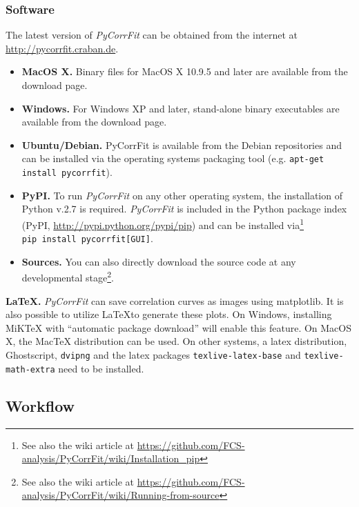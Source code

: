 \subsubsection{Software}
\label{sec:intro.prere.softw}
The latest version of \textit{PyCorrFit} can be obtained from the internet at \url{http://pycorrfit.craban.de}.
\begin{itemize}
\item \textbf{MacOS X.}
Binary files for MacOS X 10.9.5 and later are available from the download page.
\item \textbf{Windows.}
For Windows XP and later, stand-alone binary executables are available from the download page. 
\item \textbf{Ubuntu/Debian.}
PyCorrFit is available from the Debian repositories and can be installed via the operating systems packaging tool (e.g. \texttt{apt-get install pycorrfit}).
\item\textbf{PyPI.} To run \textit{PyCorrFit} on any other operating system, the installation of Python v.2.7 is required. \textit{PyCorrFit} is included in the Python package index (PyPI, \url{http://pypi.python.org/pypi/pip}) and can be installed via\footnote{See also the wiki article at \url{https://github.com/FCS-analysis/PyCorrFit/wiki/Installation_pip}}
\texttt{pip~install~pycorrfit$\!$[GUI]}.
\item \textbf{Sources.}
You can also directly download the source code at any developmental stage\footnote{See also the wiki article at \url{https://github.com/FCS-analysis/PyCorrFit/wiki/Running-from-source}}.
\end{itemize}


\vspace{1em}
\noindent \textbf{\LaTeX .} \textit{PyCorrFit} can save correlation curves as images using matplotlib. It is also possible to utilize \LaTeX to generate these plots. On Windows, installing MiKTeX  with ``automatic package download'' will enable this feature. On MacOS X, the MacTeX distribution can be used. On other systems, a latex distribution, Ghostscript, \texttt{dvipng} and the latex packages \texttt{texlive-latex-base} and \texttt{texlive-math-extra} need to be installed.


\subsection{Workflow}
\label{sec:intro.workf}

